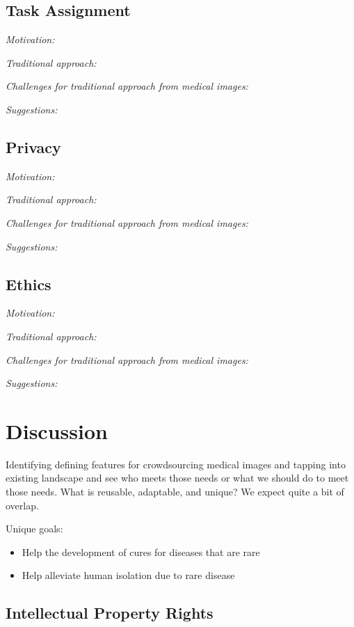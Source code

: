 \documentclass[10pt,twocolumn,letterpaper]{article}
\begin{document}
\subsection{Task Assignment}
\emph{Motivation:} 

\emph{Traditional approach:}

\emph{Challenges for traditional approach from medical images:} 

\emph{Suggestions:}

\subsection{Privacy}
\emph{Motivation:} 

\emph{Traditional approach:}

\emph{Challenges for traditional approach from medical images:} 

\emph{Suggestions:}

\subsection{Ethics}
\emph{Motivation:} 

\emph{Traditional approach:}

\emph{Challenges for traditional approach from medical images:} 

\emph{Suggestions:}

\section{Discussion}
Identifying defining features for crowdsourcing medical images and tapping into existing landscape and see who meets those needs or what we should do to meet those needs. What is reusable, adaptable, and unique?  We expect quite a bit of overlap.  

Unique goals:
\begin{itemize}
\item Help the development of cures for diseases that are rare
\item Help alleviate human isolation due to rare disease
\end{itemize}

\subsection{Intellectual Property Rights}
\end{document}
